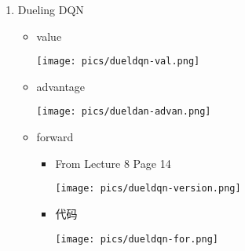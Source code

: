 \documentclass[a4paper,12pt]{article}
\begin{document}
\begin{enumerate}
    \newpage
    \item Dueling DQN
    \begin{itemize}
        \item value
        \begin{figure*}[h!]
            \centering
            \texttt{[image: pics/dueldqn-val.png]}
        \end{figure*}
        \item advantage
        \begin{figure*}[h!]
            \centering
            \texttt{[image: pics/dueldan-advan.png]}
        \end{figure*}
        \item forward
        \begin{itemize}
            \item From Lecture 8 Page 14
            \begin{figure*}[h!]
                \centering
                \texttt{[image: pics/dueldqn-version.png]}
            \end{figure*}
            \item 代码
            \begin{figure*}[h!]
                \centering
                \texttt{[image: pics/dueldqn-for.png]}
            \end{figure*}
        \end{itemize}
    \end{itemize}
\end{enumerate}
\end{document}
